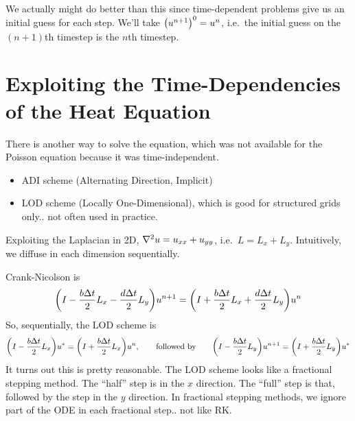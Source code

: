 \documentclass{article}
\newcommand{\Dt}{\Delta t}
\begin{document}
            We actually might do better than this since time-dependent problems give us an initial guess for each step.  We'll take $\qty(u^{n+1})^0 = u^n$, i.e.~the initial guess on the $(n+1)$th timestep is the $n$th timestep.

    \section{Exploiting the Time-Dependencies of the Heat Equation}
        There is another way to solve the equation, which was not available for the Poisson equation because it was time-independent.
        \begin{itemize}
            \item ADI scheme (Alternating Direction, Implicit)
            \item LOD scheme (Locally One-Dimensional), which is good for structured grids only.. not often used in practice.
        \end{itemize}

        Exploiting the Laplacian in 2D, $\laplacian u = u_{xx} + u_{yy}$, i.e.~$L = L_x + L_y$.  Intuitively, we diffuse in each dimension sequentially.

        Crank-Nicolson is
        \begin{align*}
            \qty(I - \frac{b\Dt}{2}L_x - \frac{d\Dt}{2}L_y)u^{n+1} = \qty(I + \frac{b\Dt}{2}L_x + \frac{d\Dt}{2}L_y)u^n
        \end{align*}
        So, sequentially, the LOD scheme is
        \begin{align*}
            \qty(I - \frac{b\Dt}{2}L_x)u^* = \qty(I + \frac{b\Dt}{2}L_x)u^n, \qquad\text{followed by}\qquad\qty(I - \frac{b\Dt}{2}L_y)u^{n+1} = \qty(I + \frac{b\Dt}{2}L_y)u^*
        \end{align*}
        It turns out this is pretty reasonable.  The LOD scheme looks like a fractional stepping method.  The ``half'' step is in the $x$ direction.  The ``full'' step is that, followed by the step in the $y$ direction.  In fractional stepping methods, we ignore part of the ODE in each fractional step.. not like RK.
\end{document}
